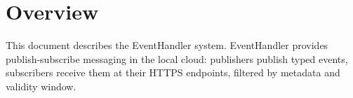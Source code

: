 \documentclass[a4paper]{arrowhead}
\begin{document}
\sloppy

\ArrowheadSetup

\begin{center}
  \vspace*{1cm}
  \huge{\arrowtitle}

  \vspace*{0.2cm}
  \LARGE{\arrowtype}
  \vspace*{1cm}

  \vspace*{\fill}


  \vspace*{1cm}
  \vspace*{\fill}

  \begin{abstract}
    This document describes the EventHandler support system of the Eclipse Arrowhead 5.2.2 framework, as implemented in \texttt{ah5-EventHandler-java-spring} of the primary Java source tree (\texttt{Eclipse-Arrowhead-java}) and deployed with the standalone Compose definition of that folder.
  \end{abstract}

  \vspace*{1cm}
\end{center}

\newpage

\tableofcontents
\newpage

\section{Overview}
\label{sec:overview}

This document describes the EventHandler system. EventHandler provides publish-subscribe messaging in the local cloud: publishers publish typed events, subscribers receive them at their HTTPS endpoints, filtered by metadata and validity window.
\end{document}
